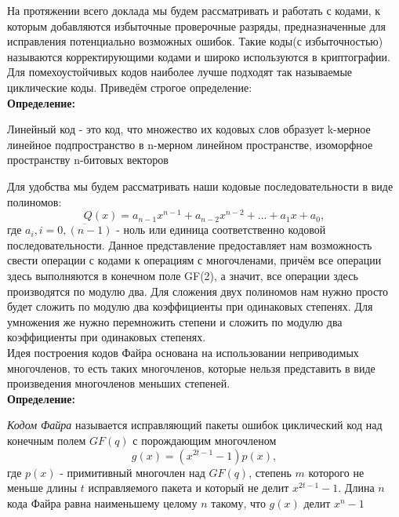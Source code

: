 \documentclass{article}
\begin{document}
        
         \hfill \break
        На протяжении всего доклада мы будем рассматривать и работать с кодами, к которым добавляются избыточные проверочные разряды, предназначенные для исправления потенциально возможных ошибок. Такие коды(с избыточностью) называются корректирующими кодами и широко используются в криптографии. \\
        
        Для помехоустойчивых кодов наиболее лучше подходят так называемые циклические коды. Приведём строгое определение: \\
        
        \textbf{Определение:}
        
        Линейный код - это код, что множество их кодовых слов образует k-мерное линейное подпространство в n-мерном линейном пространстве, изоморфное пространству n-битовых векторов
        
        Для удобства мы будем рассматривать наши кодовые последовательности в виде полиномов:
        $$Q(x) = a_{n-1}x^{n-1} + a_{n-2}x^{n-2} + ... + a_{1}x + a_{0},$$
        где $a_{i}, i = \overline{0, (n-1)}$ - ноль или единица соответственно кодовой последовательности.
   		Данное представление предоставляет нам возможность свести операции с кодами к операциям с многочленами, причём все операции здесь выполняются в конечном поле GF(2), а значит, все операции здесь производятся по модулю два. Для сложения двух полиномов нам нужно просто будет сложить по модулю два коэффициенты при одинаковых степенях. Для умножения же нужно перемножить степени и сложить по модулю два коэффициенты при одинаковых степенях.\\
   		
   		Идея построения кодов Файра основана на использовании неприводимых многочленов, то есть таких многочленов, которые нельзя представить в виде произведения многочленов меньших степеней.\\
   		
   		\textbf{Определение:}
   		
   		\textit{Кодом Файра} называется исправляющий пакеты ошибок циклический код над конечным полем $GF(q)$ с порождающим многочленом
   		$$g(x) = (x^{2t - 1} - 1)p(x),$$
   		где $p(x)$ - примитивный многочлен над $GF(q)$, степень  $m$ которого не меньше длины  $t$ исправляемого пакета и который не делит  $x^{2t - 1} - 1$. Длина $n$ кода Файра равна наименьшему целому $n$ такому, что  $g(x)$ делит $x^n - 1$
   		
\end{document}
